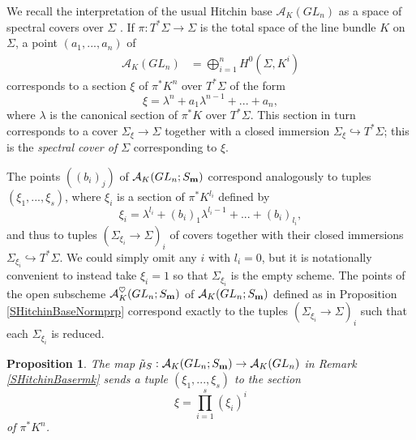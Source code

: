 \documentclass{amsart}
\newtheorem{proposition}[theorem]{Proposition}
\theoremstyle{remark}
\numberwithin{theorem}{section}
\numberwithin{equation}{section}
\begin{document}
We recall the interpretation of the usual Hitchin base $\mathcal A_K(GL_n)$ as a space of spectral covers over $\Sigma$ \cite{Hitchin2}. If $\pi:T^*\Sigma\rightarrow \Sigma$ is the total space of the line bundle $K$ on $\Sigma$, a point $(a_1,...,a_n)$ of
\begin{equation}\label{HitchinBaseGLneqn}
\begin{aligned}
    \mathcal A_K(GL_n) &= \bigoplus_{i=1}^nH^0(\Sigma,K^i)
\end{aligned}
\end{equation}
corresponds to a section $\xi$ of $\pi^*K^n$ over $T^*\Sigma$ of the form $$\xi=\lambda^n+a_1\lambda^{n-1}+ ...+a_n,$$
where $\lambda$ is the canonical section of $\pi^*K$ over $T^*\Sigma$. This section in turn corresponds to a cover ${\Sigma}_\xi \rightarrow \Sigma$ together with a closed immersion ${\Sigma}_\xi \hookrightarrow T^*\Sigma$; this is the \emph{spectral cover of $\Sigma$} corresponding to $\xi$.

The points $((b_i)_j)$ of $\mathcal A_K(GL_n;S_{\bf m})$ correspond analogously to tuples $(\xi_1,...,\xi_s)$, where $\xi_i$ is a section of $\pi^*K^{l_i}$ defined by
$$\xi_i=\lambda^{l_i}+(b_i)_1\lambda^{l_i-1}+ ...+(b_i)_{l_i},$$
and thus to tuples $({\Sigma}_{\xi_i} \rightarrow \Sigma)_i$ of covers together with their closed immersions ${\Sigma}_{\xi_i} \hookrightarrow T^*\Sigma$. We could simply omit any $i$ with $l_i=0$, but it is notationally convenient to instead take $\xi_i=1$ so that ${\Sigma}_{\xi_i}$ is the empty scheme. The points of the open subscheme $\mathcal A_K^\heartsuit(GL_n;S_{\bf m})$ of $\mathcal A_K(GL_n;S_{\bf m})$ defined as in Proposition \ref{SHitchinBaseNormprp} correspond exactly to the tuples $({\Sigma}_{\xi_i} \rightarrow \Sigma)_i$ such that each ${\Sigma}_{\xi_i}$ is reduced.

\begin{proposition}\label{GLnHitchinBaseNormprp}
    The map $\tilde{\mu}_S:\mathcal A_K(GL_n;S_{\bf m}) \rightarrow \mathcal A_K(GL_n)$ in Remark \ref{SHitchinBasermk} sends a tuple $(\xi_1,...,\xi_s)$ to the section
    \begin{equation}\label{GLnHitchinBaseNorm1eqn}
        \xi=\prod_{i=1}^s(\xi_i)^i
    \end{equation}
    of $\pi^*K^n$.
\end{proposition}
\end{document}
